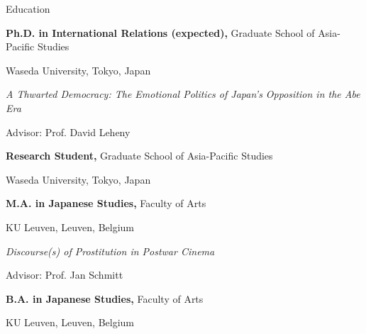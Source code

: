 \begin{rubric}{Education}

  \entry*[2020/09 -- 2026/03]%
  \textbf{Ph.D. in International Relations (expected),} Graduate School of Asia-Pacific Studies
  \par Waseda University, Tokyo, Japan%
  \par \emph{A Thwarted Democracy: The Emotional Politics of Japan's Opposition in the Abe Era}%
  \par Advisor: Prof. David Leheny

  \entry*[2019/04 -- 2020/09]%
  \textbf{Research Student,} Graduate School of Asia-Pacific Studies
  \par Waseda University, Tokyo, Japan

  \entry*[2014/09 -- 2016/09]%
  \textbf{M.A. in Japanese Studies,} Faculty of Arts
  \par KU Leuven, Leuven, Belgium%
  \par \emph{Discourse(s) of Prostitution in Postwar Cinema}%
  \par Advisor: Prof. Jan Schmitt

  \entry*[2010/09 -- 2014/09]%
  \textbf{B.A. in Japanese Studies,} Faculty of Arts
  \par KU Leuven, Leuven, Belgium
\end{rubric}
